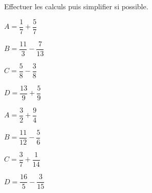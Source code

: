\documentclass[a4paper]{book}
\begin{document}
    \begin{exercice}
        Effectuer les calculs puis simplifier si possible.
        
        \begin{minipage}{0.2\linewidth}
            $A=\dfrac{1}{7}+\dfrac{5}{7}$

            \vspace{2cm}
        \end{minipage}
        \hfill\vline\hfill
        \begin{minipage}{0.2\linewidth}
            $B=\dfrac{11}{3}-\dfrac{7}{13}$    

            \vspace{2cm}
        \end{minipage}
        \hfill\vline\hfill
        \begin{minipage}{0.2\linewidth}
            $C=\dfrac{5}{8}-\dfrac{3}{8}$

            \vspace{2cm}
        \end{minipage}
        \hfill\vline\hfill
        \begin{minipage}{0.2\linewidth}
            $D=\dfrac{13}{9}+\dfrac{5}{9}$

            \vspace{2cm}
        \end{minipage}

        

        \begin{minipage}{0.2\linewidth}
            $A=\dfrac{3}{2}+\dfrac{9}{4}$

            \vspace{2cm}
        \end{minipage}
        \hfill\vline\hfill
        \begin{minipage}{0.2\linewidth}
            $B=\dfrac{11}{12}-\dfrac{5}{6}$    

            \vspace{2cm}
        \end{minipage}
        \hfill\vline\hfill
        \begin{minipage}{0.2\linewidth}
            $C=\dfrac{3}{7}+\dfrac{1}{14}$

            \vspace{2cm}
        \end{minipage}
        \hfill\vline\hfill
        \begin{minipage}{0.2\linewidth}
            $D=\dfrac{16}{5}-\dfrac{3}{15}$

            \vspace{2cm}
        \end{minipage}
    \end{exercice}
        
\end{document}
